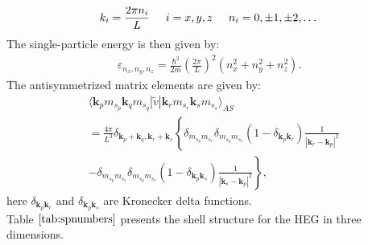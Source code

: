 \documentclass[twoside,english]{uiofysmaster}
\theoremstyle{definition}
\begin{document}
\begin{equation}
k_i=\frac{2\pi n_i}{L}\hspace{0.5cm} i=x,y,z \hspace{0.5cm} n_i=0,\pm 1,\pm 2, \dots
\end{equation}
The single-particle energy is then given by:
\begin{align}
\varepsilon_{n_{x}, n_{y}, n_{z}} = \frac{\hbar^{2}}{2m}
\left( \frac{2\pi }{L}\right)^{2}
\left( n_{x}^{2} + n_{y}^{2} + n_{z}^{2}\right).
\end{align}
The antisymmetrized matrix elements are given by:
\begin{align} \tag{5}
& \langle \mathbf{k}_{p}m_{s_{p}}\mathbf{k}_{q}m_{s_{q}}
|\tilde{v}|\mathbf{k}_{r}m_{s_{r}}\mathbf{k}_{s}m_{s_{s}}\rangle_{AS} 
\nonumber \\
& = \frac{4\pi }{L^{3}}\delta_{\mathbf{k}_{p}+\mathbf{k}_{q},
	\mathbf{k}_{r}+\mathbf{k}_{s}}\left\{ 
\delta_{m_{s_{p}}m_{s_{r}}}\delta_{m_{s_{q}}m_{s_{s}}}
\left( 1 - \delta_{\mathbf{k}_{p}\mathbf{k}_{r}}\right) 
\frac{1}{|\mathbf{k}_{r}-\mathbf{k}_{p}|^{2}}
\right. \nonumber \\
& \left. - \delta_{m_{s_{p}}m_{s_{s}}}\delta_{m_{s_{q}}m_{s_{r}}}
\left( 1 - \delta_{\mathbf{k}_{p}\mathbf{k}_{s}} \right)
\frac{1}{|\mathbf{k}_{s}-\mathbf{k}_{p}|^{2}} 
\right\} ,
\end{align}
here $\delta_{\mathbf{k}_{p}\mathbf{k}_{r}}$ and $\delta_{\mathbf{k}_{p}\mathbf{k}_{s}}$ are Kronecker delta functions.\\
Table $\ref{tab:spnumbers}$ presents the shell structure for the HEG in three dimensions.
\end{document}
